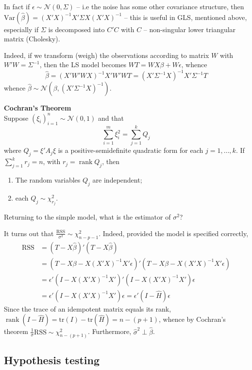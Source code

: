 \documentclass[a4paper]{article}
\newcommand{\brac}[1]{{\left ( #1 \right )}}
\newcommand{\Ncal}{\mathcal{N}}
\newcommand{\Var}[0]{{\text{Var}}}
\newcommand{\RSS}{{\text{RSS}}}
\newcommand{\tr}{\text{tr}}
\newcommand{\rank}{\mathop{\text{rank}}\nolimits}
\begin{document}
In fact if $\epsilon\sim \Ncal\brac{0,\Sigma}$ -- i.e the noise has some other covariance structure, then $\Var(\hat{\beta}) = \brac{X'X}^{-1}X'\Sigma X\brac{X'X}^{-1}$ -- this is useful in GLS, mentioned above, especially if $\Sigma$ is decomposed into $C'C$ with $C$ -- non-singular lower triangular matrix (Cholesky).

Indeed, if we transform (weigh) the observations according to matrix $W$ with $W'W = \Sigma^{-1}$, then the LS model becomes $WT=WX\beta + W\epsilon$, whence
\[\hat{\beta} = \brac{X'W'WX}^{-1}X'W'WT = \brac{X'\Sigma^{-1}X}^{-1}X'\Sigma^{-1}T\]
whence $\hat{\beta}\sim\Ncal\brac{\beta, \brac{X'\Sigma^{-1}X}^{-1}}$.

\noindent\textbf{Cochran's Theorem} \hfill\\
Suppose $\brac{\xi_i}_{i=1}^n \sim\Ncal(0, 1)$ and that
\[\sum_{i=1}^m \xi_i^2 = \sum_{j=1}^k Q_j\]
where $Q_j = \xi' A_j \xi$ is a positive-semidefinite quadratic form for each $j=1,\ldots,k$.
If $\sum_{j=1}^k r_j = n$, with $r_j = \rank{Q_j}$, then \begin{enumerate}
	\item The random variables $Q_j$ are independent;
	\item each $Q_j\sim \chi^2_{r_j}$.
\end{enumerate}

Returning to the simple model, what is the estimator of $\sigma^2$?

It turns out that $\frac{\RSS}{\sigma^2}\sim \chi^2_{n-p-1}$.
Indeed, provided the model is specified correctly, \begin{align*}
	\RSS &= \brac{T-X\hat{\beta}}'\brac{T-X\hat{\beta}} \\
	& = \brac{T-X\beta - X\brac{X'X}^{-1}X'\epsilon}'\brac{T-X\beta - X\brac{X'X}^{-1}X'\epsilon} \\
	& = \epsilon' \brac{I - X\brac{X'X}^{-1}X'}'\brac{I - X\brac{X'X}^{-1}X'}\epsilon \\
	& = \epsilon' \brac{ I - X\brac{X'X}^{-1}X' } \epsilon = \epsilon' \brac{ I - \hat{H} } \epsilon
\end{align*}
Since the trace of an idempotent matrix equals its rank, $\rank(I - \hat{H}) = \tr(I) - \tr(\hat{H}) = n- (p+1)$, whence by Cochran's theorem $\frac{1}{\sigma}\RSS\sim\chi^2_{n-(p+1)}$.
Furthermore, $\hat{\sigma}^2 \perp \hat{\beta}$.

\subsection{Hypothesis testing} %
\label{sub:hypothesis_testing}
\end{document}
